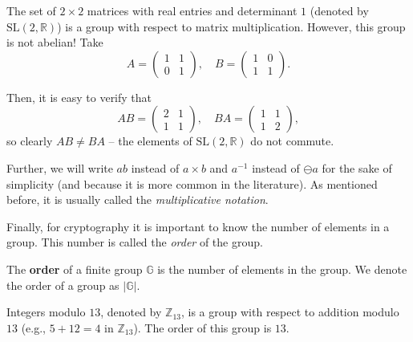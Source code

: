 \documentclass[../lecture-notes.tex]{subfiles}
\begin{document}
\begin{example}
    The set of $2 \times 2$ matrices with real entries and determinant $1$ (denoted by $\text{SL}(2,\mathbb{R})$) is a group with respect to matrix multiplication. However, this group is not abelian! Take
    \begin{equation}
        A = \begin{pmatrix}
            1 & 1 \\
            0 & 1
        \end{pmatrix}, \quad B = \begin{pmatrix}
            1 & 0 \\
            1 & 1
        \end{pmatrix}.
    \end{equation}

    Then, it is easy to verify that
    \begin{equation}
        AB = \begin{pmatrix}
            2 & 1 \\
            1 & 1
        \end{pmatrix}, \quad BA = \begin{pmatrix}
            1 & 1 \\
            1 & 2
        \end{pmatrix},
    \end{equation}
    so clearly $AB \neq BA$ -- the elements of $\text{SL}(2, \mathbb{R})$ do not commute.
\end{example}

\begin{remark}
    Further, we will write $ab$ instead of $a \times b$ and $a^{-1}$ instead of $\ominus a$ for the sake of simplicity (and because it is more common in the literature). As mentioned before, it is usually called the \textit{multiplicative notation}.
\end{remark}

Finally, for cryptography it is important to know the number of elements in a group. This number is called the \textit{order} of the group.
\begin{definition}
    The \textbf{order} of a finite group $\mathbb{G}$ is the number of elements in the group. We denote the order of a group as $|\mathbb{G}|$.
\end{definition}
\begin{example}
    Integers modulo $13$, denoted by $\mathbb{Z}_{13}$, is a group with respect to addition modulo $13$ (e.g., $5+12=4$ in $\mathbb{Z}_{13}$). The order of this group is $13$.
\end{example}
\end{document}
